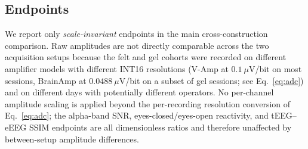 \documentclass[10pt,a4paper]{article}
\providecommand{\upmu}{\ensuremath{\mu}}        %
\begin{document}
\subsection{Endpoints}

We report only \emph{scale-invariant} endpoints in the main cross-construction comparison. Raw amplitudes are not directly comparable across the two acquisition setups because the felt and gel cohorts were recorded on different amplifier models with different INT16 resolutions (V-Amp at $0.1\ \upmu$V/bit on most sessions, BrainAmp at $0.0488\ \upmu$V/bit on a subset of gel sessions; see Eq.~\eqref{eq:adc}) and on different days with potentially different operators. No per-channel amplitude scaling is applied beyond the per-recording resolution conversion of Eq.~\eqref{eq:adc}; the alpha-band SNR, eyes-closed/eyes-open reactivity, and tEEG--eEEG SSIM endpoints are all dimensionless ratios and therefore unaffected by between-setup amplitude differences.
\end{document}
